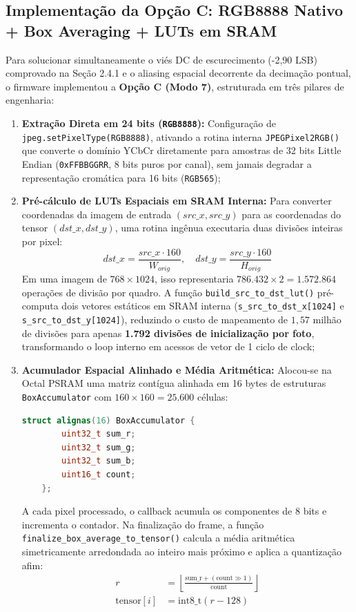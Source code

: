 \subsection{Implementação da Opção C: RGB8888 Nativo + Box Averaging + LUTs em SRAM}

Para solucionar simultaneamente o viés DC de escurecimento (-2,90 LSB) comprovado na Seção 2.4.1 e o aliasing espacial decorrente da decimação pontual, o firmware implementou a \textbf{Opção C (Modo 7)}, estruturada em três pilares de engenharia:

\begin{enumerate}
    \item \textbf{Extração Direta em 24 bits (\texttt{RGB8888}):} Configuração de \texttt{jpeg.setPixelType(RGB8888)}, ativando a rotina interna \texttt{JPEGPixel2RGB()} que converte o domínio YCbCr diretamente para amostras de 32 bits Little Endian (\texttt{0xFFBBGGRR}, 8 bits puros por canal), sem jamais degradar a representação cromática para 16 bits (\texttt{RGB565});
    \item \textbf{Pré-cálculo de LUTs Espaciais em SRAM Interna:} Para converter coordenadas da imagem de entrada $(src\_x, src\_y)$ para as coordenadas do tensor $(dst\_x, dst\_y)$, uma rotina ingênua executaria duas divisões inteiras por pixel:
    \begin{equation}
    dst\_x = \frac{src\_x \cdot 160}{W_{orig}}, \quad dst\_y = \frac{src\_y \cdot 160}{H_{orig}}
    \end{equation}
    Em uma imagem de $768 \times 1024$, isso representaria $786.432 \times 2 = 1.572.864$ operações de divisão por quadro. A função \texttt{build\_src\_to\_dst\_lut()} pré-computa dois vetores estáticos em SRAM interna (\texttt{s\_src\_to\_dst\_x[1024]} e \texttt{s\_src\_to\_dst\_y[1024]}), reduzindo o custo de mapeamento de $1,57$ milhão de divisões para apenas \textbf{1.792 divisões de inicialização por foto}, transformando o loop interno em acessos de vetor de 1 ciclo de clock;
    \item \textbf{Acumulador Espacial Alinhado e Média Aritmética:} Alocou-se na Octal PSRAM uma matriz contígua alinhada em 16 bytes de estruturas \texttt{BoxAccumulator} com $160 \times 160 = 25.600$ células:
    \begin{lstlisting}[language=C++]
    struct alignas(16) BoxAccumulator {
        uint32_t sum_r;
        uint32_t sum_g;
        uint32_t sum_b;
        uint16_t count;
    };
    \end{lstlisting}
    A cada pixel processado, o callback acumula os componentes de 8 bits e incrementa o contador. Na finalização do frame, a função \texttt{finalize\_box\_average\_to\_tensor()} calcula a média aritmética simetricamente arredondada ao inteiro mais próximo e aplica a quantização afim:
    \begin{align}
    r &= \left\lfloor \frac{\text{sum\_r} + (\text{count} \gg 1)}{\text{count}} \right\rfloor \\
    \text{tensor}[i] &= \text{int8\_t}(r - 128)
    \end{align}
\end{enumerate}

